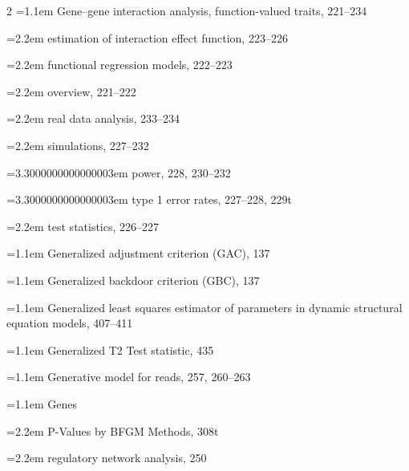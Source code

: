 \begin{multicols}{2}
\noindent\hangindent=1.1em Gene--gene interaction analysis, function-valued traits, 221--234\par
\noindent\hangindent=2.2em \hspace*{1.1em}estimation of interaction effect function, 223--226\par
\noindent\hangindent=2.2em \hspace*{1.1em}functional regression models, 222--223\par
\noindent\hangindent=2.2em \hspace*{1.1em}overview, 221--222\par
\noindent\hangindent=2.2em \hspace*{1.1em}real data analysis, 233--234\par
\noindent\hangindent=2.2em \hspace*{1.1em}simulations, 227--232\par
\noindent\hangindent=3.3000000000000003em \hspace*{2.2em}power, 228, 230--232\par
\noindent\hangindent=3.3000000000000003em \hspace*{2.2em}type 1 error rates, 227--228, 229t\par
\noindent\hangindent=2.2em \hspace*{1.1em}test statistics, 226--227\par
\noindent\hangindent=1.1em Generalized adjustment criterion (GAC), 137\par
\noindent\hangindent=1.1em Generalized backdoor criterion (GBC), 137\par
\noindent\hangindent=1.1em Generalized least squares estimator of parameters in dynamic structural equation models, 407--411\par
\noindent\hangindent=1.1em Generalized T2 Test statistic, 435\par
\noindent\hangindent=1.1em Generative model for reads, 257, 260--263\par
\noindent\hangindent=1.1em Genes\par
\noindent\hangindent=2.2em \hspace*{1.1em}P-Values by BFGM Methods, 308t\par
\noindent\hangindent=2.2em \hspace*{1.1em}regulatory network analysis, 250\par

\end{multicols}
